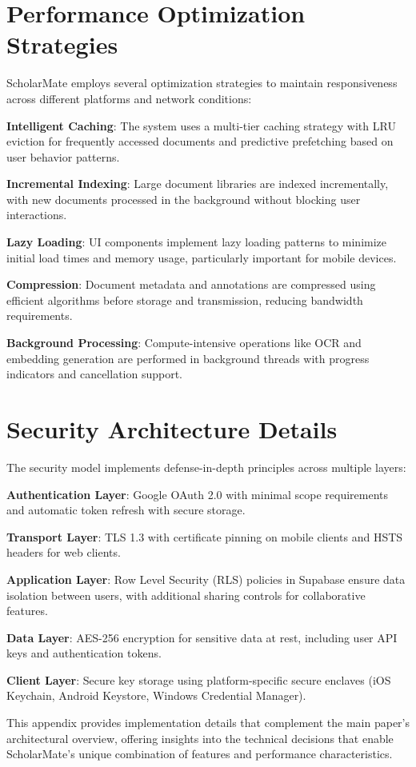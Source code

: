 \documentclass[conference]{IEEEtran}
\begin{document}
\section{Performance Optimization Strategies}

ScholarMate employs several optimization strategies to maintain responsiveness across different platforms and network conditions:

\textbf{Intelligent Caching}: The system uses a multi-tier caching strategy with LRU eviction for frequently accessed documents and predictive prefetching based on user behavior patterns.

\textbf{Incremental Indexing}: Large document libraries are indexed incrementally, with new documents processed in the background without blocking user interactions.

\textbf{Lazy Loading}: UI components implement lazy loading patterns to minimize initial load times and memory usage, particularly important for mobile devices.

\textbf{Compression}: Document metadata and annotations are compressed using efficient algorithms before storage and transmission, reducing bandwidth requirements.

\textbf{Background Processing}: Compute-intensive operations like OCR and embedding generation are performed in background threads with progress indicators and cancellation support.

\section{Security Architecture Details}

The security model implements defense-in-depth principles across multiple layers:

\textbf{Authentication Layer}: Google OAuth 2.0 with minimal scope requirements and automatic token refresh with secure storage.

\textbf{Transport Layer}: TLS 1.3 with certificate pinning on mobile clients and HSTS headers for web clients.

\textbf{Application Layer}: Row Level Security (RLS) policies in Supabase ensure data isolation between users, with additional sharing controls for collaborative features.

\textbf{Data Layer}: AES-256 encryption for sensitive data at rest, including user API keys and authentication tokens.

\textbf{Client Layer}: Secure key storage using platform-specific secure enclaves (iOS Keychain, Android Keystore, Windows Credential Manager).

This appendix provides implementation details that complement the main paper's architectural overview, offering insights into the technical decisions that enable ScholarMate's unique combination of features and performance characteristics.
\end{document}
